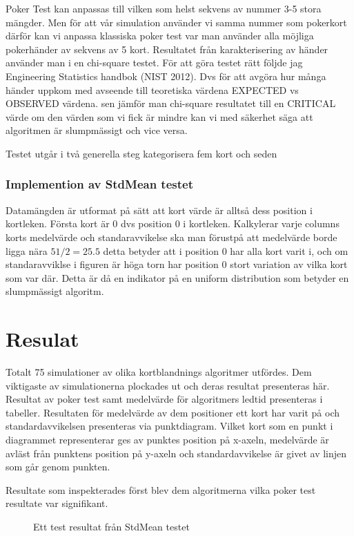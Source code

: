 \documentclass[swedish,a4paper]{article}
\begin{document}
Poker Test kan anpassas till vilken som helst sekvens av nummer 3-5 stora
mängder. Men för att vår simulation använder vi samma nummer som pokerkort
därför kan vi anpassa klassiska poker test var man använder alla möjliga
pokerhänder av sekvens av 5 kort. Resultatet från karakterisering av händer
använder man i en chi-square testet. För att göra testet rätt följde jag
Engineering Statistics handbok (NIST 2012). Dvs för att avgöra hur många 
händer
uppkom med avseende till teoretiska värdena EXPECTED vs OBSERVED värdena. sen
jämför man chi-square resultatet till en CRITICAL värde om den värden som vi
fick är mindre kan vi med säkerhet säga att algoritmen är slumpmässigt och 
vice versa.

Testet utgår i två generella steg kategorisera fem kort och seden 

\subsubsection{Implemention av StdMean testet}
Datamängden är utformat på sätt att kort värde är alltså dess position i
kortleken. Första kort är 0 dvs position 0 i kortleken. Kalkylerar varje
columns korts medelvärde och standaravvikelse ska man förustpå att medelvärde
borde ligga nära $51/2= 25.5$ detta betyder att i position 0 har alla kort varit
i, och om standaravviklse i figuren är höga torn har position 0 stort variation
av vilka kort som var där. Detta är då en indikator på en uniform distribution
som betyder en slumpmässigt algoritm.

\section{Resulat}
Totalt 75 simulationer av olika kortblandnings algoritmer utfördes. Dem
viktigaste av simulationerna plockades ut och deras resultat presenteras
här. Resultat av poker test samt medelvärde för algoritmers ledtid
presenteras i tabeller. Resultaten för medelvärde av dem positioner ett
kort har varit på och standardavvikelsen presenteras via punktdiagram.
Vilket kort som en punkt i diagrammet representerar ges av punktes
position på x-axeln, medelvärde är avläst från punktens position på
y-axeln och standardavvikelse är givet av linjen som går genom punkten. 

Resultate som inspekterades först blev dem algoritmerna vilka poker test
resultate var signifikant. 

\begin{figure}[ht]
    \begin{center}
        
    \end{center}
    \caption{Ett test resultat från StdMean testet}
    \label{fig:test_figure}
\end{figure}
\end{document}
